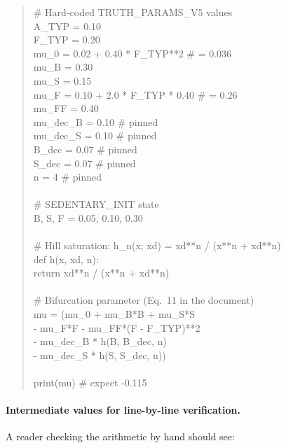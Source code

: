 \documentclass[11pt,a4paper]{article}
\theoremstyle{definition}
\begin{document}
\begin{quote}\small\ttfamily
\# Hard-coded TRUTH\_PARAMS\_V5 values \\
A\_TYP   = 0.10 \\
F\_TYP   = 0.20 \\
mu\_0   = 0.02 + 0.40 * F\_TYP**2          \# = 0.036 \\
mu\_B   = 0.30 \\
mu\_S   = 0.15 \\
mu\_F   = 0.10 + 2.0 * F\_TYP * 0.40       \# = 0.26 \\
mu\_FF  = 0.40 \\
mu\_dec\_B = 0.10                          \# pinned \\
mu\_dec\_S = 0.10                          \# pinned \\
B\_dec  = 0.07                            \# pinned \\
S\_dec  = 0.07                            \# pinned \\
n      = 4                               \# pinned \\
\\
\# SEDENTARY\_INIT state \\
B, S, F = 0.05, 0.10, 0.30 \\
\\
\# Hill saturation: h\_n(x; xd) = xd**n / (x**n + xd**n) \\
def h(x, xd, n): \\
\hspace*{1.5em}return xd**n / (x**n + xd**n) \\
\\
\# Bifurcation parameter (Eq.\ 11 in the document) \\
mu = (mu\_0 + mu\_B*B + mu\_S*S \\
\hspace*{2.5em}- mu\_F*F - mu\_FF*(F - F\_TYP)**2 \\
\hspace*{2.5em}- mu\_dec\_B * h(B, B\_dec, n) \\
\hspace*{2.5em}- mu\_dec\_S * h(S, S\_dec, n)) \\
\\
print(mu)                                \# expect -0.115
\end{quote}

\paragraph{Intermediate values for line-by-line verification.}
A reader checking the arithmetic by hand should see:
\end{document}
